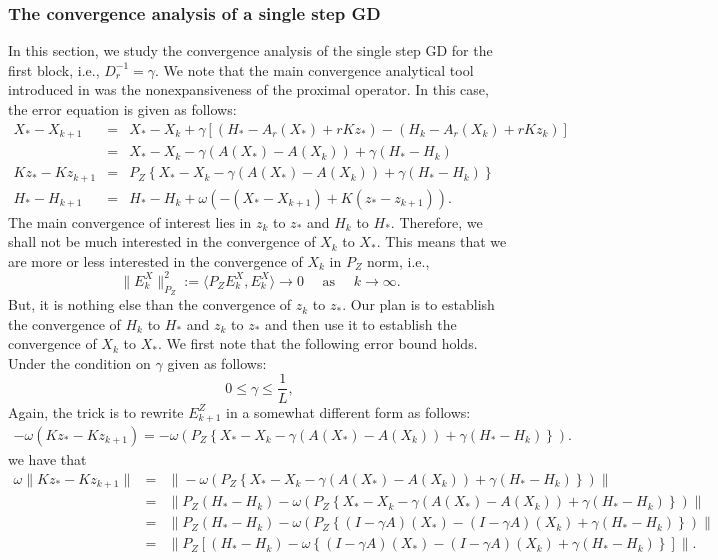 \subsubsection{The convergence analysis of a single step GD} In this section, we study the convergence analysis of the single step GD for the first block, i.e., $D_r^{-1} = \gamma$. We note that the main convergence analytical tool introduced in \cite{mishchenko2022proxskip} was the nonexpansiveness of the proximal operator. In this case, the error equation is given as follows: 
\begin{eqnarray*}
X_{*} - X_{k+1} &=& X_* - X_k + \gamma \left [(H_* - A_r(X_*) + r K z_*) - (H_k - A_r(X_k) + r K z_k) \right ] \\
&=& X_* - X_k - \gamma (A(X_*) - A(X_k)) + \gamma (H_* - H_k) \\ 
Kz_{*} - Kz_{k+1} &=& P_Z \left \{X_* - X_k - \gamma (A(X_*) - A(X_k)) + \gamma (H_* - H_k) \right \} \\
H_{*} - H_{k+1} &=& H_* - H_k + \omega (-(X_{*} - X_{k+1}) + K ( z_{*} - z_{k+1})). 
\end{eqnarray*}
The main convergence of interest lies in $z_k$ to $z_*$ and $H_k$ to $H_*$. Therefore, we shall not be much interested in the convergence of $X_k$ to $X_*$. This means that we are more or less interested in the convergence of $X_k$ in $P_Z$ norm, i.e., 
\begin{equation*}
\|E_k^X\|_{P_Z}^2 := \langle P_Z E_k^X, E_k^X \rangle \rightarrow 0 \quad \mbox{ as } \quad k \rightarrow \infty.
\end{equation*}
But, it is nothing else than the convergence of $z_k$ to $z_*$. Our plan is to establish the convergence of $H_k$ to $H_*$ and $z_k$ to $z_*$ and then use it to establish the convergence of $X_k$ to $X_*$. We first note that the following error bound holds. Under the condition on $\gamma$ given as follows: 
\begin{equation}
0 \leq \gamma \leq \frac{1}{L}, 
\end{equation}
Again, the trick is to rewrite $E_{k+1}^Z$ in a somewhat different form as follows: 
\begin{eqnarray*}
-\omega(Kz_{*} - Kz_{k+1}) = -\omega \left ( P_Z \left \{X_* - X_k - \gamma (A(X_*) - A(X_k)) + \gamma (H_* - H_k) \right \} \right ).
\end{eqnarray*}
we have that 
\begin{eqnarray*}
\omega \|Kz_{*} - Kz_{k+1}\| &=& \|-\omega \left ( P_Z \left \{X_* - X_k - \gamma (A(X_*) - A(X_k)) + \gamma (H_* - H_k) \right \} \right ) \| \\ 
&=& \|P_Z (H_* - H_k) - \omega \left ( P_Z \left \{X_* - X_k - \gamma (A(X_*) - A(X_k)) + \gamma (H_* - H_k) \right \} \right ) \| \\
&=& \|P_Z (H_* - H_k) - \omega \left ( P_Z \left \{(I - \gamma A)(X_*) - (I - \gamma A)(X_k) + \gamma (H_* - H_k) \right \} \right ) \| \\ 
&=& \|P_Z [(H_* - H_k) - \omega \left \{(I - \gamma A)(X_*) - (I - \gamma A)(X_k) + \gamma (H_* - H_k) \right \}] \|. 
\end{eqnarray*}
